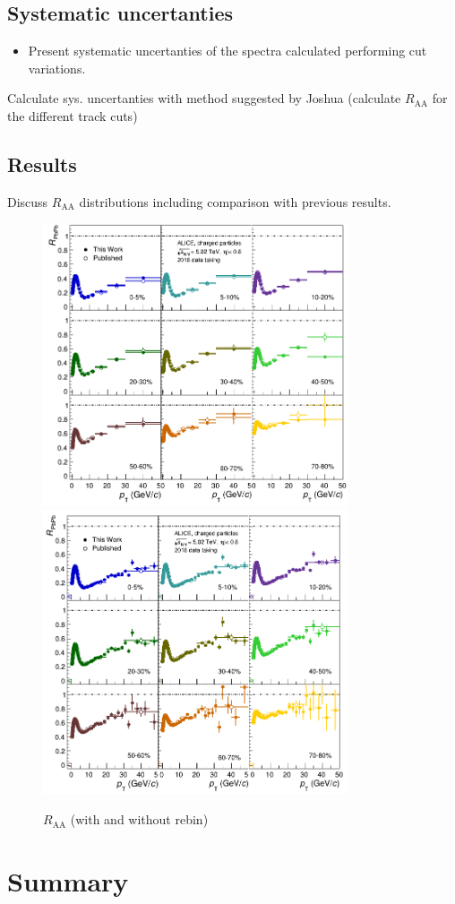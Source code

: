 \documentclass[12pt,a4paper]{report}
\begin{document}
\section{Systematic uncertanties}
\begin{itemize}
\item Present systematic uncertanties of the spectra calculated performing cut variations. 
\end{itemize}
Calculate sys. uncertanties with method suggested by Joshua (calculate $R_\text{AA}$ for the different track cuts)
\section{Results}
Discuss $R_\text{AA}$ distributions including comparison with previous results.
\begin{figure}[tb!]
\centering
\includegraphics[width=9cm]{Plots/RaaRebinned.png} 
\includegraphics[width=9cm]{Plots/Raa.png} 
\caption{$R_\text{AA}$ (with and without rebin)}  
\end{figure}
\chapter{Summary}


\end{document}
